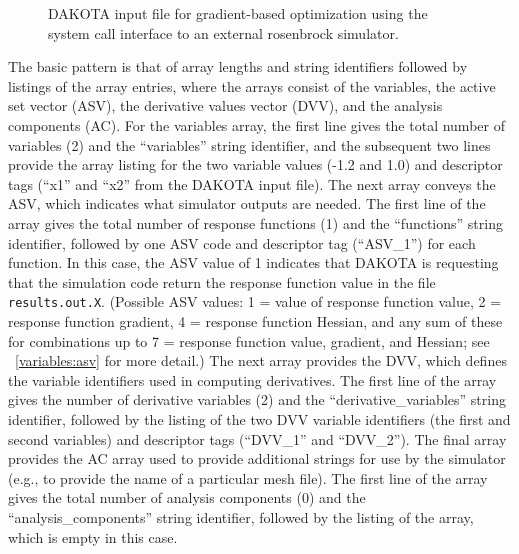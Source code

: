 \begin{figure}[b!]
  \begin{bigbox}
    \begin{small}
    \end{small}
  \end{bigbox}
  \caption{DAKOTA input file for gradient-based optimization using the
    system call interface to an external rosenbrock simulator.}
  \label{tutorial:rosenbrock_user}
\end{figure}

The basic pattern is that of array lengths and string identifiers
followed by listings of the array entries, where the arrays consist of
the variables, the active set vector (ASV), the derivative values
vector (DVV), and the analysis components (AC).  For the variables
array, the first line gives the total number of variables (2) and the
``variables'' string identifier, and the subsequent two lines provide
the array listing for the two variable values (-1.2 and 1.0) and
descriptor tags (``x1'' and ``x2'' from the DAKOTA input file).  The
next array conveys the ASV, which indicates what
simulator outputs are needed.  The first line of the array gives the total number
of response functions (1) and the ``functions'' string identifier,
followed by one ASV code and descriptor tag
(``ASV\_1'') for each function.  In this case, the ASV value of 1 indicates that DAKOTA
is requesting that the simulation code return the response function
value in the file \texttt{results.out.X}. (Possible ASV values: 1 = value of
response function value, 2 = response function gradient, 4 = response
function Hessian, and any sum of these for combinations up to
7 = response function value, gradient, and Hessian; see ~\ref{variables:asv} for
more detail.)  The next array provides the DVV, which defines the
variable identifiers used in computing derivatives.  The first line of
the array gives the number of derivative variables (2) and the
``derivative\_variables'' string identifier, followed by the listing of
the two DVV variable identifiers (the first and second variables) and
descriptor tags (``DVV\_1'' and ``DVV\_2'').  The final array provides
the AC array used to provide additional strings for use by the
simulator (e.g., to provide the name of a particular mesh file).  The
first line of the array gives the total number of analysis components
(0) and the ``analysis\_components'' string identifier, followed by the
listing of the array, which is empty in this case.

